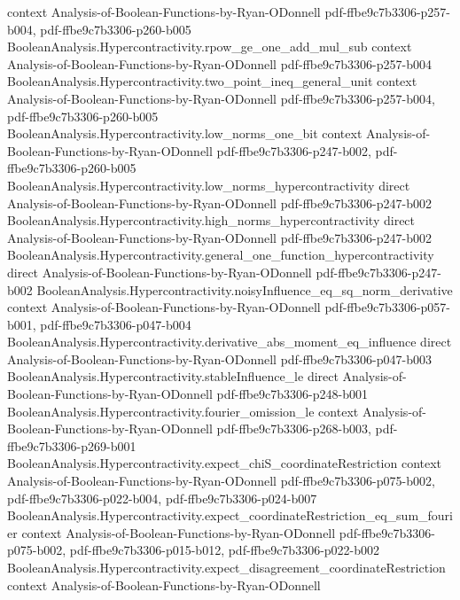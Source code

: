 \begin{theorem}
  {context}
  {Analysis-of-Boolean-Functions-by-Ryan-ODonnell}
  {pdf-ffbe9c7b3306-p257-b004,
    pdf-ffbe9c7b3306-p260-b005}
\proofstep
  {BooleanAnalysis.Hypercontractivity.rpow_ge_one_add_mul_sub}
  {context}
  {Analysis-of-Boolean-Functions-by-Ryan-ODonnell}
  {pdf-ffbe9c7b3306-p257-b004}
\proofstep
  {BooleanAnalysis.Hypercontractivity.two_point_ineq_general_unit}
  {context}
  {Analysis-of-Boolean-Functions-by-Ryan-ODonnell}
  {pdf-ffbe9c7b3306-p257-b004,
    pdf-ffbe9c7b3306-p260-b005}
\proofstep
  {BooleanAnalysis.Hypercontractivity.low_norms_one_bit}
  {context}
  {Analysis-of-Boolean-Functions-by-Ryan-ODonnell}
  {pdf-ffbe9c7b3306-p247-b002,
    pdf-ffbe9c7b3306-p260-b005}
\proofstep
  {BooleanAnalysis.Hypercontractivity.low_norms_hypercontractivity}
  {direct}
  {Analysis-of-Boolean-Functions-by-Ryan-ODonnell}
  {pdf-ffbe9c7b3306-p247-b002}
\proofstep
  {BooleanAnalysis.Hypercontractivity.high_norms_hypercontractivity}
  {direct}
  {Analysis-of-Boolean-Functions-by-Ryan-ODonnell}
  {pdf-ffbe9c7b3306-p247-b002}
\proofstep
  {BooleanAnalysis.Hypercontractivity.general_one_function_hypercontractivity}
  {direct}
  {Analysis-of-Boolean-Functions-by-Ryan-ODonnell}
  {pdf-ffbe9c7b3306-p247-b002}
\proofstep
  {BooleanAnalysis.Hypercontractivity.noisyInfluence_eq_sq_norm_derivative}
  {context}
  {Analysis-of-Boolean-Functions-by-Ryan-ODonnell}
  {pdf-ffbe9c7b3306-p057-b001,
    pdf-ffbe9c7b3306-p047-b004}
\proofstep
  {BooleanAnalysis.Hypercontractivity.derivative_abs_moment_eq_influence}
  {direct}
  {Analysis-of-Boolean-Functions-by-Ryan-ODonnell}
  {pdf-ffbe9c7b3306-p047-b003}
\proofstep
  {BooleanAnalysis.Hypercontractivity.stableInfluence_le}
  {direct}
  {Analysis-of-Boolean-Functions-by-Ryan-ODonnell}
  {pdf-ffbe9c7b3306-p248-b001}
\proofstep
  {BooleanAnalysis.Hypercontractivity.fourier_omission_le}
  {context}
  {Analysis-of-Boolean-Functions-by-Ryan-ODonnell}
  {pdf-ffbe9c7b3306-p268-b003,
    pdf-ffbe9c7b3306-p269-b001}
\proofstep
  {BooleanAnalysis.Hypercontractivity.expect_chiS_coordinateRestriction}
  {context}
  {Analysis-of-Boolean-Functions-by-Ryan-ODonnell}
  {pdf-ffbe9c7b3306-p075-b002,
    pdf-ffbe9c7b3306-p022-b004,
    pdf-ffbe9c7b3306-p024-b007}
\proofstep
  {BooleanAnalysis.Hypercontractivity.expect_coordinateRestriction_eq_sum_fourier}
  {context}
  {Analysis-of-Boolean-Functions-by-Ryan-ODonnell}
  {pdf-ffbe9c7b3306-p075-b002,
    pdf-ffbe9c7b3306-p015-b012,
    pdf-ffbe9c7b3306-p022-b002}
\proofstep
  {BooleanAnalysis.Hypercontractivity.expect_disagreement_coordinateRestriction}
  {context}
  {Analysis-of-Boolean-Functions-by-Ryan-ODonnell}

\end{theorem}
